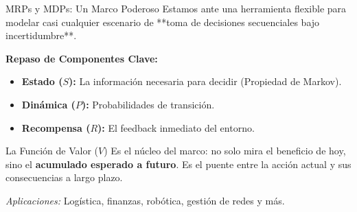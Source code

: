 \documentclass[xcolor=dvipsnames]{beamer}
\begin{document}
\begin{frame}{MRPs y MDPs: Un Marco Poderoso}
Estamos ante una herramienta flexible para modelar casi cualquier escenario de **toma de decisiones secuenciales bajo incertidumbre**.

\textbf{Repaso de Componentes Clave:}
\begin{itemize}
    \item \textbf{Estado ($S$):} La informaci\'on necesaria para decidir (Propiedad de Markov).
    \item \textbf{Din\'amica ($P$):} Probabilidades de transici\'on.
   \item \textbf{Recompensa ($R$):} El feedback inmediato del entorno.
\end{itemize}

\begin{block}{La Funci\'on de Valor ($V$)}
    Es el n\'ucleo del marco: no solo mira el beneficio de hoy, sino el \textbf{acumulado esperado a futuro}. Es el puente entre la acci\'on actual y sus consecuencias a largo plazo.
\end{block}

\textit{Aplicaciones:} Log\'istica, finanzas, rob\'otica, gesti\'on de redes y m\'as.
\end{frame}
%
%
%    
%
%
\end{document}
